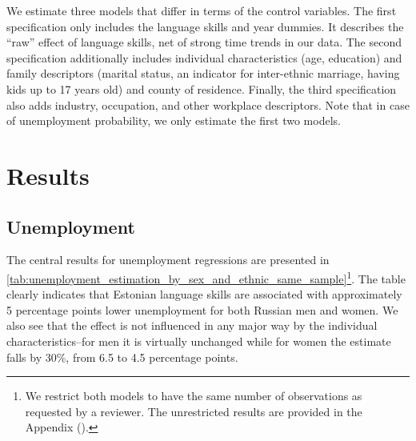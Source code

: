 \documentclass[12pt, a4paper]{article}
\begin{document}
We estimate three models that differ in terms of the control variables. The first specification only includes the language skills
and year dummies. It describes the ``raw'' effect of language skills,
net of strong time trends in our data.
The second specification additionally includes individual
characteristics (age, education) and family descriptors (marital
status, an indicator for inter-ethnic marriage, having kids up to 17 years
old) and county of residence. 
Finally, the third specification also adds industry, occupation, and other
workplace descriptors.
Note that in case of unemployment probability,
we only estimate the first two models.


\section{Results}
\label{sec:results}
\subsection{Unemployment}
\label{subsec:basic_model_unemployment}

The central results for unemployment regressions are presented in
\cref{tab:unemployment_estimation_by_sex_and_ethnic_same_sample}\footnote{We
 restrict both models to have the same number of observations as
 requested by a reviewer. The unrestricted results are provided in the Appendix ().}.
The
table clearly indicates that Estonian language skills are associated
with approximately 5 percentage points lower unemployment for both
Russian men and women. We also see that the effect is not 
influenced in any major way by the individual characteristics--for men it is
virtually unchanged while for women the estimate falls by 30\%, from
6.5 to 4.5 percentage points.
\end{document}
